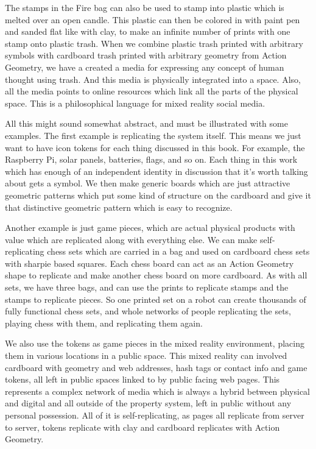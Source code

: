 The stamps in the Fire bag can also be used to stamp into plastic which
is melted over an open candle. This plastic can then be colored in with
paint pen and sanded flat like with clay, to make an infinite number of
prints with one stamp onto plastic trash. When we combine plastic trash
printed with arbitrary symbols with cardboard trash printed with
arbitrary geometry from Action Geometry, we have a created a media for
expressing any concept of human thought using trash. And this media is
physically integrated into a space. Also, all the media points to online
resources which link all the parts of the physical space. This is a
philosophical language for mixed reality social media.

All this might sound somewhat abstract, and must be illustrated with
some examples. The first example is replicating the system itself. This
means we just want to have icon tokens for each thing discussed in this
book. For example, the Raspberry Pi, solar panels, batteries, flags, and
so on. Each thing in this work which has enough of an independent
identity in discussion that it's worth talking about gets a symbol. We
then make generic boards which are just attractive geometric patterns
which put some kind of structure on the cardboard and give it that
distinctive geometric pattern which is easy to recognize.

Another example is just game pieces, which are actual physical products
with value which are replicated along with everything else. We can make
self-replicating chess sets which are carried in a bag and used on
cardboard chess sets with sharpie based squares. Each chess board can
act as an Action Geometry shape to replicate and make another chess
board on more cardboard. As with all sets, we have three bags, and can
use the prints to replicate stamps and the stamps to replicate pieces.
So one printed set on a robot can create thousands of fully functional
chess sets, and whole networks of people replicating the sets, playing
chess with them, and replicating them again.

We also use the tokens as game pieces in the mixed reality environment,
placing them in various locations in a public space. This mixed reality
can involved cardboard with geometry and web addresses, hash tags or
contact info and game tokens, all left in public spaces linked to by
public facing web pages. This represents a complex network of media
which is always a hybrid between physical and digital and all outside of
the property system, left in public without any personal possession. All
of it is self-replicating, as pages all replicate from server to server,
tokens replicate with clay and cardboard replicates with Action
Geometry.

